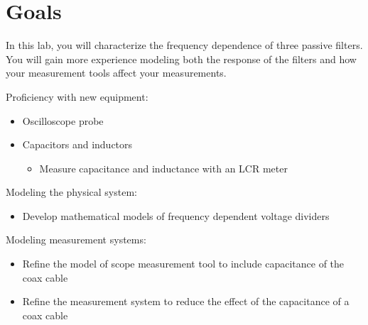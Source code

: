 \documentclass[10pt]{PhysLab1C} %
\begin{document}
\maketitle %


\thispagestyle{firstpage} %


\section{Goals}

In this lab, you will characterize the frequency dependence of three passive filters. You will gain more experience modeling both the response of the filters and how your measurement tools affect your measurements.

Proficiency with new equipment:

\begin{itemize}
\item
  Oscilloscope probe
\item
  Capacitors and inductors

  \begin{itemize}
  \item
    Measure capacitance and inductance with an LCR meter
  \end{itemize}
\end{itemize}

Modeling the physical system:

\begin{itemize}
\item
  Develop mathematical models of frequency dependent voltage dividers
\end{itemize}

Modeling measurement systems:

\begin{itemize}
\item
  Refine the model of scope measurement tool to include capacitance of
  the coax cable
\item
  Refine the measurement system to reduce the effect of the capacitance
  of a coax cable
\end{itemize}
\end{document}
